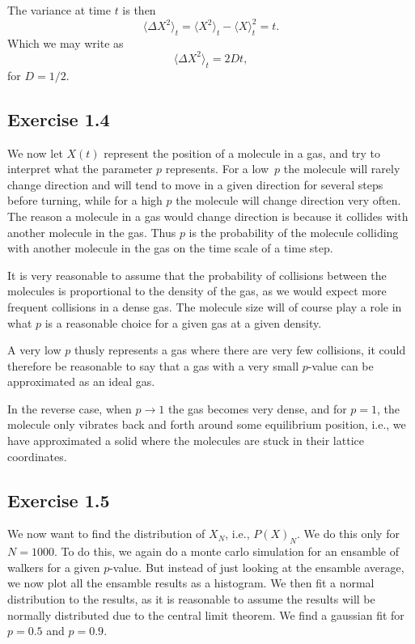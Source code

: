 \documentclass[a4paper, 11pt, notitlepage, english]{article}
\begin{document}
The variance at time $t$ is then
$$\langle \Delta X^2 \rangle_t = \langle X^2 \rangle_t - \langle X \rangle_t^2 = t.$$
Which we may write as
$$\langle \Delta X^2 \rangle_t = 2Dt,$$
for $D=1/2$. 

\clearpage

\subsection*{Exercise 1.4}

We now let $X(t)$ represent the position of a molecule in a gas, and try to interpret what the parameter $p$ represents. For a low $p$ the molecule will rarely change direction and will tend to move in a given direction for several steps before turning, while for a high $p$ the molecule will change direction very often. The reason a molecule in a gas would change direction is because it collides with another molecule in the gas. Thus $p$ is the probability of the molecule colliding with another molecule in the gas on the time scale of a time step.

It is very reasonable to assume that the probability of collisions between the molecules is proportional to the density of the gas, as we would expect more frequent collisions in a dense gas. The molecule size will of course play a role in what $p$ is a reasonable choice for a given gas at a given density.

A very low $p$ thusly represents a gas where there are very few collisions, it could therefore be reasonable to say that a gas with a very small $p$-value can be approximated as an ideal gas.

In the reverse case, when $p \to 1$ the gas becomes very dense, and for $p = 1$, the molecule only vibrates back and forth around some equilibrium position, i.e., we have approximated a solid where the molecules are stuck in their lattice coordinates.

\subsection*{Exercise 1.5}

We now want to find the distribution of $X_N$, i.e., $P(X)_N$. We do this only for $N=1000$. To do this, we again do a monte carlo simulation for an ensamble of walkers for a given $p$-value. But instead of just looking at the ensamble average, we now plot all the ensamble results as a histogram. We then fit a normal distribution to the results, as it is reasonable to assume the results will be normally distributed due to the central limit theorem. We find a gaussian fit for $p=0.5$ and $p=0.9$.
\end{document}
